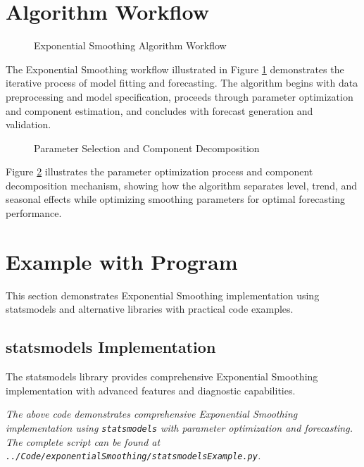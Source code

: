 \section{Algorithm Workflow}
\label{sec:algorithm_workflow}

\begin{figure}[H]
    \centering
    
    \caption{Exponential Smoothing Algorithm Workflow}
    \label{fig:algorithm_workflow}
\end{figure}

The Exponential Smoothing workflow illustrated in Figure \ref{fig:algorithm_workflow} demonstrates the iterative process of model fitting and forecasting. The algorithm begins with data preprocessing and model specification, proceeds through parameter optimization and component estimation, and concludes with forecast generation and validation.

\begin{figure}[H]
    \centering
    
    \caption{Parameter Selection and Component Decomposition}
    \label{fig:parameter_selection}
\end{figure}

Figure \ref{fig:parameter_selection} illustrates the parameter optimization process and component decomposition mechanism, showing how the algorithm separates level, trend, and seasonal effects while optimizing smoothing parameters for optimal forecasting performance.

\section{Example with Program}
\label{sec:example_program}

This section demonstrates Exponential Smoothing implementation using statsmodels and alternative libraries with practical code examples.

\subsection{statsmodels Implementation}
\label{subsec:statsmodels_example}

The statsmodels library provides comprehensive Exponential Smoothing implementation with advanced features and diagnostic capabilities.


\noindent\textit{The above code demonstrates comprehensive Exponential Smoothing implementation using \texttt{statsmodels} with parameter optimization and forecasting. The complete script can be found at \texttt{../Code/exponentialSmoothing/statsmodelsExample.py}.}

